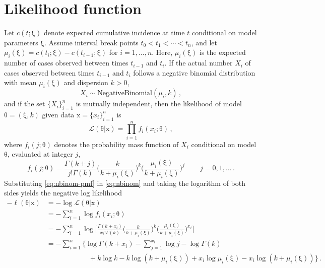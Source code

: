 \documentclass[12pt]{article}
\renewcommand{\vec}[1]{\bm{\mathrm{#1}}}
\begin{document}
\setlength{\parskip}{3mm}
\setlength{\parindent}{7mm}

\section{Likelihood function}

Let $c(t;\vec{\xi})$ denote expected cumulative incidence at time $t$
conditional on model parameters $\vec{\xi}$. Assume interval break
points $t_0 < t_1 < \cdots < t_n$,
and let $\mu_i(\vec{\xi}) = c(t_i;\vec{\xi}) - c(t_{i-1};\vec{\xi})$
for $i = 1,\ldots,n$. Here, $\mu_i(\vec{\xi})$ is the expected number
of cases observed between times $t_{i-1}$ and $t_i$. If the actual number
$X_i$ of cases observed between times $t_{i-1}$ and $t_i$ follows a negative
binomial distribution with mean $\mu_i(\vec{\xi})$ and dispersion $k > 0$,
%
\begin{equation}
  \label{eq:nbinom}
  X_i \sim \mathrm{NegativeBinomial}(\mu_i,k)\,,
\end{equation}
%
and if the set $\{X_i\}_{i=1}^{n}$ is mutually independent, then the
likelihood of model $\vec{\theta} = (\vec{\xi},k)$ given data
$\vec{x} = \{x_i\}_{i=1}^{n}$ is
%
\begin{equation}
  \label{eq:likelihood}
  \mathcal{L}(\vec{\theta}|\vec{x}) = \prod_{i=1}^{n} f_i(x_i;\vec{\theta})\,,
\end{equation}
%
where $f_i(j;\vec{\theta})$ denotes the probability mass function of $X_i$
conditional on model $\vec{\theta}$, evaluated at integer $j$,
%
\begin{equation}
  \label{eq:nbinom-pmf}
  f_i(j;\vec{\theta})
  = \frac{\Gamma(k + j)}{j! \Gamma(k)} \bigg(\frac{k}{k + \mu_i(\vec{\xi})}\bigg)^k \bigg(\frac{\mu_i(\vec{\xi})}{k + \mu_i(\vec{\xi})}\bigg)^j\,\qquad j = 0,1,\ldots\,.
\end{equation}
%
Substituting \eqref{eq:nbinom-pmf} in \eqref{eq:nbinom} and taking the
logarithm of both sides yields the negative log likelihood
%
\begin{equation}
  \label{eq:nll}
  \begin{aligned}
    -\ell(\vec{\theta}|\vec{x})
    &= -\log \mathcal{L}(\vec{\theta}|\vec{x}) \\
    &= -\sum_{i=1}^{n} \log f_i(x_i;\vec{\theta}) \\
    &= -\sum_{i=1}^{n} \log \bigg[ \frac{\Gamma(k + x_i)}{x_i! \Gamma(k)} \bigg( \frac{k}{k + \mu_i(\vec{\xi})} \bigg)^{k} \bigg( \frac{\mu_i(\vec{\xi})}{k + \mu_i(\vec{\xi})} \bigg)^{x_i} \bigg] \\
    &= -\sum_{i=1}^{n} \Big\{ \log \Gamma(k + x_i) - \sum_{j=1}^{x_i} \log j - \log \Gamma(k) \\
    &\hspace{1in} + k \log k - k \log (k + \mu_i(\vec{\xi})) + x_i \log \mu_i(\vec{\xi}) - x_i \log (k + \mu_i(\vec{\xi})) \Big\}\,.
  \end{aligned}
\end{equation}
\end{document}

